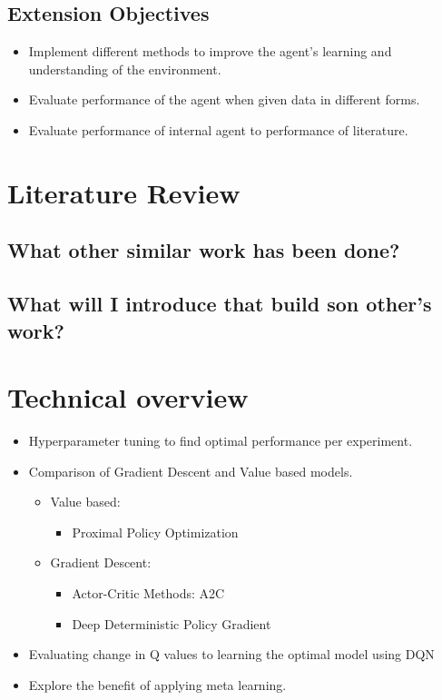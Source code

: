 \documentclass{surrey_disso_style}
\begin{document}
\subsection{Extension Objectives}
\begin{itemize}
   \item [\ding{168}] Implement different methods to improve the agent’s learning and understanding of the environment.
   \item [\ding{168}] Evaluate performance of the agent when given data in different forms.
   \item [\ding{168}] Evaluate performance of internal agent to performance of literature.
\end{itemize}

\section{Literature Review}

\subsection{What other similar work has been done?}

\subsection{What will I introduce that build son other's work?}

\section{Technical overview}

\begin{itemize}
   \item Hyperparameter tuning to find optimal performance per experiment.
   \item Comparison of Gradient Descent and Value based models.
   \begin{itemize}
      \item Value based:
         \begin{itemize}
            \item Proximal Policy Optimization
         \end{itemize}
      \item Gradient Descent:
         \begin{itemize}
            \item Actor-Critic Methods: A2C 
            \item Deep Deterministic Policy Gradient
         \end{itemize}
   \end{itemize}
   \item Evaluating change in Q values to learning the optimal model using DQN
   \item Explore the benefit of applying meta learning.
\end{itemize}
\end{document}
